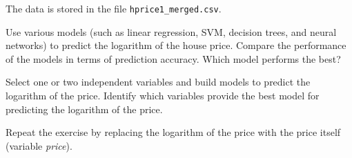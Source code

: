\documentclass{article}
\begin{document}
The data is stored in the file \lstinline$hprice1_merged.csv$.

Use various models (such as linear regression, SVM, decision trees, and neural networks) to predict the logarithm of the house price. Compare the performance of the models in terms of prediction accuracy. Which model performs the best?

Select one or two independent variables and build models to predict the logarithm of the price. Identify which variables provide the best model for predicting the logarithm of the price.

Repeat the exercise by replacing the logarithm of the price with the price itself (variable \emph{price}).
\end{document}
